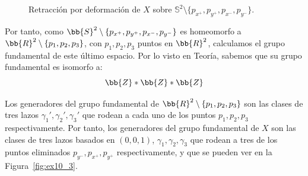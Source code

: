 \documentclass[12pt]{article}
\begin{document}
\begin{ejercicio}
\begin{figure}[htbp]
\begin{tikzpicture}[scale=1.5, >=stealth]
            \end{tikzpicture}
            \caption{Retracción por deformación de $X$ sobre $\mathbb{S}^2 \setminus \{p_{x^+}, p_{y^+}, p_{x^-}, p_{y^-}\}$.}
            \label{fig:ex10_2}
        \end{figure}

        Por tanto, como $\bb{S}^2\setminus \{p_{x^+},p_{y^+}, p_{x^-}, p_{y^-}\}$ es homeomorfo a $\bb{R}^2\setminus \{p_1, p_2, p_3\}$, con $p_1, p_2, p_3$ puntos en $\bb{R}^2$, calculamos el grupo fundamental de este último espacio. Por lo visto en Teoría, sabemos que su grupo fundamental es isomorfo a:
        \begin{equation*}
            \bb{Z} \ast \bb{Z} \ast \bb{Z}
        \end{equation*}

        Los generadores del grupo fundamental de $\bb{R}^2\setminus \{p_1, p_2, p_3\}$ son las clases de tres lazos $\gamma_1', \gamma_2', \gamma_3'$ que rodean a cada uno de los puntos $p_1, p_2, p_3$ respectivamente. Por tanto, los generadores del grupo fundamental de $X$ son las clases de tres lazos basados en $(0,0,1)$, $\gamma_1, \gamma_2, \gamma_3$ que rodean a tres de los puntos eliminados $p_{y^-}, p_{x^+}, p_{y^+}$ respectivamente, y que se pueden ver en la Figura~\ref{fig:ex10_3}.
        \begin{figure}[htbp]
            \centering
\end{figure}
\end{ejercicio}
\end{document}
